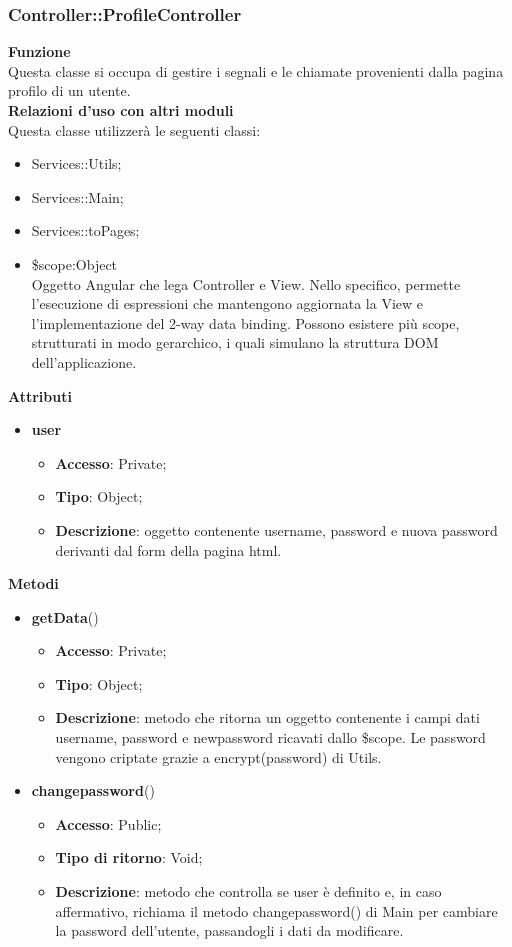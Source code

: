 {	\subsubsection{Controller::\-ProfileController}{
		\textbf{Funzione}\\
		\indent Questa classe si occupa di gestire i segnali e le chiamate provenienti dalla pagina profilo di un utente.\\
		\textbf{Relazioni d'uso con altri moduli}\\
		\indent Questa classe utilizzerà le seguenti classi:
		\begin{itemize}
			\item Services::\-Utils;
			\item Services::\-Main;
			\item Services::\-toPages;
			\item \$scope:Object\\
				\indent Oggetto Angular che lega Controller e View. Nello specifico, permette l'esecuzione di espressioni che mantengono aggiornata la View e l'implementazione del 2-way data binding. Possono esistere più scope, strutturati in modo gerarchico, i quali simulano la struttura DOM dell'applicazione.
		\end{itemize}
		\textbf{Attributi}\\
	    \begin{itemize}
	    	\item \textbf{user}
			\begin{itemize}
				\item \textbf{Accesso}: Private;
				\item \textbf{Tipo}: Object;
				\item \textbf{Descrizione}: oggetto contenente username, password e nuova password derivanti dal form della pagina html.
			\end{itemize}
	    \end{itemize}
		\textbf{Metodi}
		\begin{itemize}
			\item \textbf{getData}()
			\begin{itemize}
				\item \textbf{Accesso}: Private;
				\item \textbf{Tipo}: Object;
				\item \textbf{Descrizione}: metodo che ritorna un oggetto contenente i campi dati username, password e newpassword ricavati dallo \$scope. Le password vengono criptate grazie a encrypt(password) di Utils.
			\end{itemize}
			\item \textbf{changepassword}()
			\begin{itemize}
				\item \textbf{Accesso}: Public;
				\item \textbf{Tipo di ritorno}: Void;
				\item \textbf{Descrizione}: metodo che controlla se user è definito e, in caso affermativo, richiama il metodo changepassword() di Main per cambiare la password dell'utente, passandogli i dati da modificare.
			\end{itemize}
		\end{itemize}
	}
}
